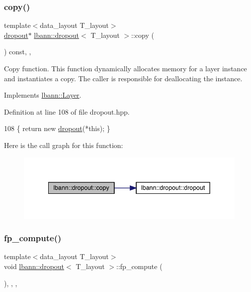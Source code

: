 \subsubsection{\texorpdfstring{copy()}{copy()}}
{\footnotesize\ttfamily template$<$data\+\_\+layout T\+\_\+layout$>$ \\
\hyperlink{classlbann_1_1dropout}{dropout}$\ast$ \hyperlink{classlbann_1_1dropout}{lbann\+::dropout}$<$ T\+\_\+layout $>$\+::copy (\begin{DoxyParamCaption}{ }\end{DoxyParamCaption}) const\hspace{0.3cm}{\ttfamily [inline]}, {\ttfamily [override]}, {\ttfamily [virtual]}}

Copy function. This function dynamically allocates memory for a layer instance and instantiates a copy. The caller is responsible for deallocating the instance. 

Implements \hyperlink{classlbann_1_1Layer_af420f22bbac801c85483ade84588a23f}{lbann\+::\+Layer}.



Definition at line 108 of file dropout.\+hpp.


\begin{DoxyCode}
108 \{ \textcolor{keywordflow}{return} \textcolor{keyword}{new} \hyperlink{classlbann_1_1dropout_a301be902f285c5cf1d0cd743119a09d8}{dropout}(*\textcolor{keyword}{this}); \}
\end{DoxyCode}
Here is the call graph for this function\+:\nopagebreak
\begin{figure}[H]
\begin{center}
\leavevmode
\includegraphics[width=342pt]{classlbann_1_1dropout_a0e6e50b50f8c2620315f3257bbab41b3_cgraph}
\end{center}
\end{figure}
\mbox{\label{classlbann_1_1dropout_a9ed94f278835b6c9e8185de01705e53a}} 
\subsubsection{\texorpdfstring{fp\+\_\+compute()}{fp\_compute()}}
{\footnotesize\ttfamily template$<$data\+\_\+layout T\+\_\+layout$>$ \\
void \hyperlink{classlbann_1_1dropout}{lbann\+::dropout}$<$ T\+\_\+layout $>$\+::fp\+\_\+compute (\begin{DoxyParamCaption}{ }\end{DoxyParamCaption})\hspace{0.3cm}{\ttfamily [inline]}, {\ttfamily [override]}, {\ttfamily [protected]}, {\ttfamily [virtual]}}

